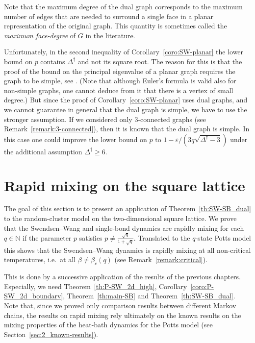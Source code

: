 \documentclass{dis}
\theoremstyle{citing}
\begin{document}
Note that the maximum degree of the dual graph corresponds to 
the maximum number of edges that are needed to surround a 
single face in a planar representation of the original graph. 
This quantity is sometimes called the \emph{maximum face-degree} of 
$G$ in the literature.

Unfortunately, in the second inequality of 
Corollary~\ref{coro:SW-planar} 
the lower bound on $p$ contains ${\Delta}^\dag$ and not its square root. 
The reason for this is that the proof of the bound on the 
principal eigenvalue of a planar graph requires the graph to be  
simple, see \cite[Cor.~17]{Ha}. 
(Note that although Euler's formula is valid also for non-simple 
graphs, one cannot deduce from it that there is a vertex 
of small degree.)
But since the proof of Corollary~\ref{coro:SW-planar} uses 
dual graphs, and we cannot guarantee in general that the 
dual graph is simple, we have to use the stronger assumption.
If we considered only 3-connected graphs (see 
Remark~\ref{remark:3-connected}), then it is known that 
the dual graph is simple. In this case one could improve 
the lower bound on $p$ to $1-{\varepsilon}/(3q\sqrt{{\Delta}^\dag-3})$ 
under the additional assumption ${\Delta}^\dag\ge6$.

\vspace{2mm}

\section{Rapid mixing on the square lattice} \label{sec:5_square}

The goal of this section is to present an application 
of Theorem~\ref{th:SW-SB_dual} to the random-cluster model 
on the two-dimensional square lattice. 
We prove that the Swendsen--Wang and single-bond dynamics 
are rapidly mixing for each $q\in{\ensuremath{\mathbb{N}}}$ if the parameter 
$p$ satisfies $p\neq\frac{\sqrt{q}}{1+\sqrt{q}}$. 
Translated to the $q$-state Potts model this shows that the 
Swendsen--Wang dynamics is rapidly mixing at all 
non-critical temperatures, i.e.~at all $\beta\neq\beta_c(q)$ 
(see Remark~\ref{remark:critical}).

This is done by a successive application of the results of the 
previous chapters.
Especially, we need Theorem~\ref{th:P-SW_2d_high}, 
Corollary~\ref{coro:P-SW_2d_boundary}, Theorem~\ref{th:main-SB} 
and Theorem~\ref{th:SW-SB_dual}. 
Note that, since we proved only comparison results between 
different Markov chains, the results on rapid mixing 
rely ultimately on the known results on the mixing properties 
of the heat-bath dynamics for the Potts model (see 
Section~\ref{sec:2_known-results}).
\end{document}
